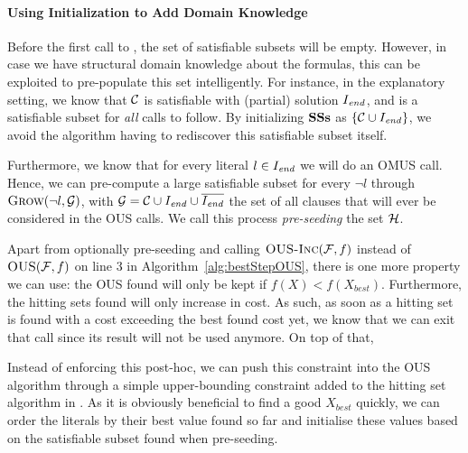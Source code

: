 \paragraph{Using Initialization to Add Domain Knowledge}
Before the first call to \omusinc, the set \satsets of satisfiable subsets will be empty. 
However, in case we have structural domain knowledge about the formulas, this can be exploited to pre-populate this set intelligently. 
For instance, in the explanatory setting, we know that $\mathcal{C} $ is satisfiable with (partial) solution $I_{\mathit{end}}$, and \formulac is a satisfiable subset for \emph{all} \omusinc calls to follow. 
By initializing $\mathbf{SSs}$ as $\{\mathcal{C}  \cup I_{\mathit{end}}\}$, we avoid the algorithm having to rediscover this satisfiable subset itself.

Furthermore, we know that for every literal $ l \in I_{\mathit{end}}$ we will do an OMUS call. Hence, we can pre-compute a large satisfiable subset for every $\lnot l$ through $\textsc{Grow}(\lnot l, \mathcal{G} )$, with $\mathcal{G}  = {\cal C} \cup I_{\mathit{end}} \cup \overline{I_{\mathit{end}}}$ the set of all clauses that will ever be considered in the OUS calls. We call this process \textit{pre-seeding} the set $\mathcal{H} $.

Apart from optionally pre-seeding and calling $\textsc{OUS-Inc}(\mathcal{F} ,f)$ instead of $\textsc{OUS}(\mathcal{F} ,f)$ on line 3 in Algorithm~\ref{alg:bestStepOUS}, there is one more property we can use: the OUS found will only be kept if $f(X)<f(X_\mathit{best})$.
Furthermore, the hitting sets found will only increase in cost. As such, as soon as a hitting set is found with a cost exceeding the best found cost yet, we know that we can exit that \omus call since its result will not be used anymore. 
On top of that, 


Instead of enforcing this post-hoc, we can push this constraint into the OUS algorithm through a simple upper-bounding constraint added to the hitting set algorithm in \omusinc. As it is obviously beneficial to find a good $X_\mathit{best}$ quickly, we can order the literals by their best value found so far and initialise these values based on the satisfiable subset found when pre-seeding.



